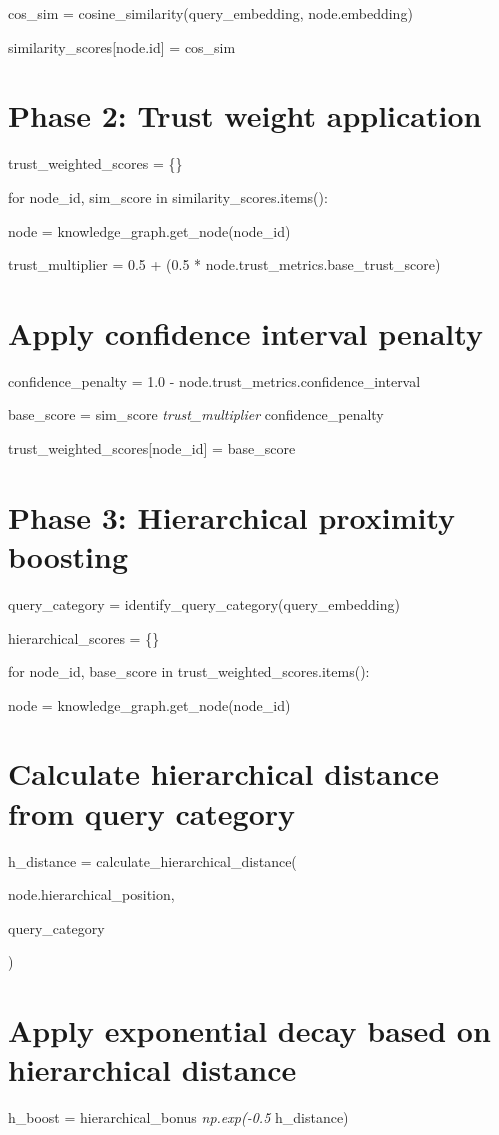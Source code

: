 \documentclass[a4paper,11pt]{article}
\begin{document}
cos\_sim = cosine\_similarity(query\_embedding, node.embedding)

similarity\_scores[node.id] = cos\_sim


\section{Phase 2: Trust weight application}
trust\_weighted\_scores = \{\}

for node\_id, sim\_score in similarity\_scores.items():

node = knowledge\_graph.get\_node(node\_id)

trust\_multiplier = 0.5 + (0.5 * node.trust\_metrics.base\_trust\_score)


\section{Apply confidence interval penalty}
confidence\_penalty = 1.0 - node.trust\_metrics.confidence\_interval


base\_score = sim\_score \textit{ trust\_multiplier } confidence\_penalty

trust\_weighted\_scores[node\_id] = base\_score


\section{Phase 3: Hierarchical proximity boosting}
query\_category = identify\_query\_category(query\_embedding)

hierarchical\_scores = \{\}


for node\_id, base\_score in trust\_weighted\_scores.items():

node = knowledge\_graph.get\_node(node\_id)


\section{Calculate hierarchical distance from query category}
h\_distance = calculate\_hierarchical\_distance(

node.hierarchical\_position,

query\_category

)


\section{Apply exponential decay based on hierarchical distance}
h\_boost = hierarchical\_bonus \textit{ np.exp(-0.5 } h\_distance)
\end{document}
